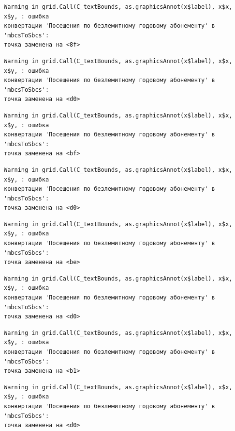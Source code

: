 \documentclass[
  letterpaper,
  DIV=11,
  numbers=noendperiod]{scrreprt}
\begin{document}
\begin{verbatim}
Warning in grid.Call(C_textBounds, as.graphicsAnnot(x$label), x$x, x$y, : ошибка
конвертации 'Посещения по безлемитному годовому абонементу' в 'mbcsToSbcs':
точка заменена на <8f>
\end{verbatim}

\begin{verbatim}
Warning in grid.Call(C_textBounds, as.graphicsAnnot(x$label), x$x, x$y, : ошибка
конвертации 'Посещения по безлемитному годовому абонементу' в 'mbcsToSbcs':
точка заменена на <d0>
\end{verbatim}

\begin{verbatim}
Warning in grid.Call(C_textBounds, as.graphicsAnnot(x$label), x$x, x$y, : ошибка
конвертации 'Посещения по безлемитному годовому абонементу' в 'mbcsToSbcs':
точка заменена на <bf>
\end{verbatim}

\begin{verbatim}
Warning in grid.Call(C_textBounds, as.graphicsAnnot(x$label), x$x, x$y, : ошибка
конвертации 'Посещения по безлемитному годовому абонементу' в 'mbcsToSbcs':
точка заменена на <d0>
\end{verbatim}

\begin{verbatim}
Warning in grid.Call(C_textBounds, as.graphicsAnnot(x$label), x$x, x$y, : ошибка
конвертации 'Посещения по безлемитному годовому абонементу' в 'mbcsToSbcs':
точка заменена на <be>
\end{verbatim}

\begin{verbatim}
Warning in grid.Call(C_textBounds, as.graphicsAnnot(x$label), x$x, x$y, : ошибка
конвертации 'Посещения по безлемитному годовому абонементу' в 'mbcsToSbcs':
точка заменена на <d0>
\end{verbatim}

\begin{verbatim}
Warning in grid.Call(C_textBounds, as.graphicsAnnot(x$label), x$x, x$y, : ошибка
конвертации 'Посещения по безлемитному годовому абонементу' в 'mbcsToSbcs':
точка заменена на <b1>
\end{verbatim}

\begin{verbatim}
Warning in grid.Call(C_textBounds, as.graphicsAnnot(x$label), x$x, x$y, : ошибка
конвертации 'Посещения по безлемитному годовому абонементу' в 'mbcsToSbcs':
точка заменена на <d0>
\end{verbatim}
\end{document}
